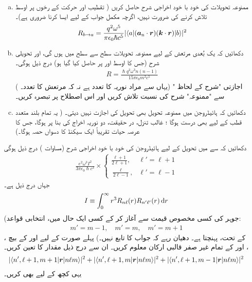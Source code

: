 \begin{enumerate}[a.]
\item
ممنوعہ تحویلات کی خود با خود اخراجی شرح حاصل کریں (  تقطیب اور حرکت کے رخوں  پر اوسط  تلاش کرنے کی ضرورت نہیں،  اگرچہ  مکمل جواب کے لیے ایسا کرنا ضروری ہے)۔ 
\begin{align}
	R_{b\to a} = \frac{q^2\omega^5}{\pi\epsilon_0\hslash c^5}|\langle a|({{\boldsymbol{a}}_{\textup{n}}}\cdot{\ensuremath{{\boldsymbol{r}}}})({\boldsymbol{k}}\cdot {\ensuremath{{\boldsymbol{r}}}})|b \rangle|^2
\end{align}
\item
 دکھائیں کہ یک بُعدی مرتعش کے لیے ممنوعہ تحویلات سطح  سے سطح  میں ہوں گی،  اور تحویلی شرح  (جس کا اوسط   اور  پر حاصل کیا گیا ہو)  درج ذیل ہوگی۔
\begin{align}
	R = \frac{\hslash q^2\omega^3n(n-1)}{15\pi\epsilon_0m^2c^5}
\end{align}
( یہاں  سے مراد نوریہ کا تعدد ہے نہ کہ مرتعش کا تعدد۔) "  اجازتی "شرح کے لحاظ سے "ممنوعہ" شرح کی  نسبت  تلاش کریں اور  اس  اصطلاح پر تبصرہ کریں۔
\item
 دکھائیں کہ ہائیڈروجن میں ممنوعہ تحویل بھی  تحویل  کی اجازت نہیں دیتی۔ (  یہ تمام بلند متعدد قطب کے لیے بھی درست ہوگا ؛ غالب تنزل، در حقیقت، دو نوریہ اخراج کی بنا پر ہوگا،  جس کا عرصہ حیات تقریباً ایک  سیکنڈ کا دسواں حصہ ہوگا۔)
 \end{enumerate}
دکھائیں کہ  سے  میں تحویل کے لیے ہائیڈروجن کی  خود با خود اخراجی شرح  (مساوات ) درج ذیل ہوگی
\begin{align}
	\frac{e^2\omega^3I^2}{3\pi\epsilon_0\hslash c^3}\times
	\begin{cases}
		\frac{\ell +1}{2\ell +1}, & \ell '= \ell +1  \\
		\frac{\ell }{2\ell -1}, & \ell '= \ell -1 
	\end{cases}
\end{align}
جہاں  درج ذیل ہے۔
\begin{align}
	I\equiv\int_{0}^{\infty} r^3R_{n\ell }(r)R_{n'\ell '}(r)\dif r
\end{align}
(جوہر  کی کسی مخصوص قیمت سے آغاز کر کے   کسی ایک   حال  میں، انتخابی قواعد:
\begin{align*}
m'=m-1,\quad m'=m,\quad m'=m+1
\end{align*}
  کے تحت،  پہنچتا ہے۔ دھیان رہے کہ جواب  کا تابع  نہیں۔)    پہلے  صورت کے لیے  اور  کے بیچ ، ،  اور  کے تمام غیر صفر قالبی ارکان معلوم کریں۔ ان سے درج ذیل مقدار کا  تعین کریں۔
\begin{align*}
	|\langle n', \ell +1,m+1|{{\boldsymbol{r}}}|n\ell m \rangle|^2 + |\langle n', \ell +1, m|{{\boldsymbol{r}}}|n\ell m \rangle|^2+|\langle n', \ell +1, m-1|{{\boldsymbol{r}}}|n\ell m\rangle|^2
\end{align*}
یہی کچھ  کے لیے بھی کریں۔

